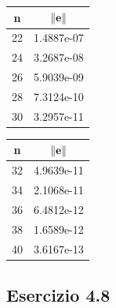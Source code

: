 \begin{tabular}{ | c | r }
\textbf{n} & \multicolumn{1}{c}{$\mathbf{\norm{e}}$} \\
\hline
22 & 1.4887e-07 \\
24 & 3.2687e-08 \\
26 & 5.9039e-09 \\
28 & 7.3124e-10 \\
30 & 3.2957e-11 \\
\end{tabular}
\begin{tabular}{ | c | r }
\textbf{n} & \multicolumn{1}{c}{$\mathbf{\norm{e}}$} \\
\hline
32 & 4.9639e-11 \\
34 & 2.1068e-11 \\
36 & 6.4812e-12 \\
38 & 1.6589e-12 \\
40 & 3.6167e-13
\end{tabular}



	\subsection {Esercizio 4.8}
	
